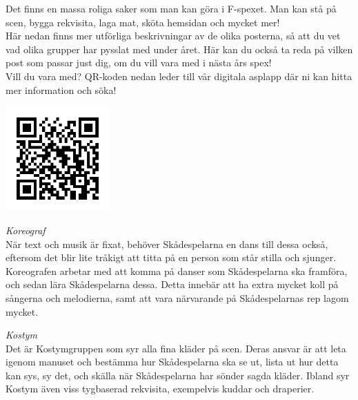 \label{asplapp}

Det finns en massa roliga saker som man kan göra i F-spexet. Man kan stå på scen, bygga
rekvisita, laga mat, sköta hemsidan och mycket mer! \\

Här nedan finns mer utförliga beskrivningar av de olika posterna, så att du vet vad olika grupper har pysslat med under året. Här kan du också ta reda på vilken post som passar just dig, om du vill vara med i nästa års spex!\\

Vill du vara med? QR-koden nedan leder till vår digitala asplapp där ni kan hitta mer information och söka! %


\begin{center}
    \includegraphics[width=0.3\textwidth]{Bilder/QR/F-spexet_aspformular.png}
\end{center}
\vspace{0.5cm}
\begingroup
\fontsize{11}{12}\selectfont
{}\baselineskip


{\Large\textit{Koreograf}} \\
När text och musik är fixat, behöver Skådespelarna en dans till dessa också, eftersom det blir lite tråkigt att titta på en person som står stilla och sjunger. Koreografen arbetar med att komma på danser som Skådespelarna ska framföra, och sedan lära Skådespelarna dessa. Detta innebär att ha extra mycket koll på sångerna och melodierna, samt att vara närvarande på Skådespelarnas rep lagom mycket.


{\Large\textit{Kostym}} \\
Det är Kostymgruppen som syr alla fina kläder på scen. Deras ansvar är att leta igenom manuset och bestämma hur Skådespelarna ska se ut, lista ut hur detta kan sys, sy det, och skälla när Skådespelarna har sönder sagda kläder. Ibland syr Kostym även viss tygbaserad rekvisita, exempelvis kuddar och draperier.

